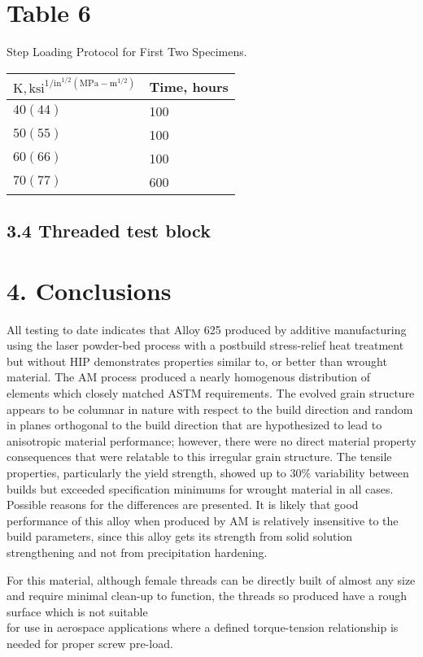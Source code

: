 \documentclass[10pt]{article}
\begin{document}
\section*{Table 6}
Step Loading Protocol for First Two Specimens.

\begin{center}
\begin{tabular}{ll}
\hline
$\mathrm{K}, \mathrm{ksi}^{1 / \mathrm{in}^{1 / 2}\left(\mathrm{MPa}-\mathrm{m}^{1 / 2}\right)}$ & Time, hours \\
\hline
$40(44)$ & 100 \\
$50(55)$ & 100 \\
$60(66)$ & 100 \\
$70(77)$ & 600 \\
\hline
\end{tabular}
\end{center}

\subsection*{3.4 Threaded test block}
\section*{4. Conclusions}
All testing to date indicates that Alloy 625 produced by additive manufacturing using the laser powder-bed process with a postbuild stress-relief heat treatment but without HIP demonstrates properties similar to, or better than wrought material. The AM process produced a nearly homogenous distribution of elements which closely matched ASTM requirements. The evolved grain structure appears to be columnar in nature with respect to the build direction and random in planes orthogonal to the build direction that are hypothesized to lead to anisotropic material performance; however, there were no direct material property consequences that were relatable to this irregular grain structure. The tensile properties, particularly the yield strength, showed up to $30 \%$ variability between builds but exceeded specification minimums for wrought material in all cases. Possible reasons for the differences are presented. It is likely that good performance of this alloy when produced by AM is relatively insensitive to the build parameters, since this alloy gets its strength from solid solution strengthening and not from precipitation hardening.

For this material, although female threads can be directly built of almost any size and require minimal clean-up to function, the threads so produced have a rough surface which is not suitable\\
for use in aerospace applications where a defined torque-tension relationship is needed for proper screw pre-load.
\end{document}
